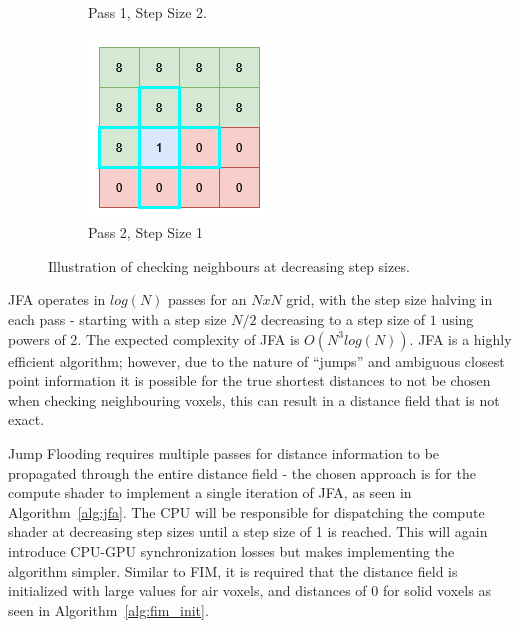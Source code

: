\begin{figure}[htbp]
\begin{subfigure}[t]{0.32\textwidth}
        \caption{Pass 1, Step Size 2.}
    \end{subfigure}
    \hfill
    \begin{subfigure}[t]{0.32\textwidth}
        \centering
        \includegraphics[width=\textwidth]{figures/jfa_pass_2.drawio.png}
        \caption{Pass 2, Step Size 1}
    \end{subfigure}
    \caption{Illustration of checking neighbours at decreasing step sizes.}
    \label{fig:jfa_passes}
\end{figure}


JFA operates in \(log(N)\) passes for an \(NxN\) grid, with the step size halving in each pass - starting with a step
size \(N / 2\) decreasing to a step size of \(1\) using powers of 2. The expected complexity of JFA is \(O(N^3log(N))\).
JFA is a highly efficient algorithm; however, due to the nature of ``jumps'' and ambiguous closest point information it
is possible for the true shortest distances to not be chosen when checking neighbouring voxels, this can result in a
distance field that is not exact.

Jump Flooding requires multiple passes for distance information to be propagated through the entire distance field - the
chosen approach is for the compute shader to implement a single iteration of JFA, as seen in Algorithm~\ref{alg:jfa}.
The CPU will be responsible for dispatching the compute shader at decreasing step sizes until a step size of 1 is
reached. This will again introduce CPU-GPU synchronization losses but makes implementing the algorithm simpler. Similar
to FIM, it is required that the distance field is initialized with large values for air voxels, and distances of \(0\)
for solid voxels as seen in Algorithm~\ref{alg:fim_init}.

